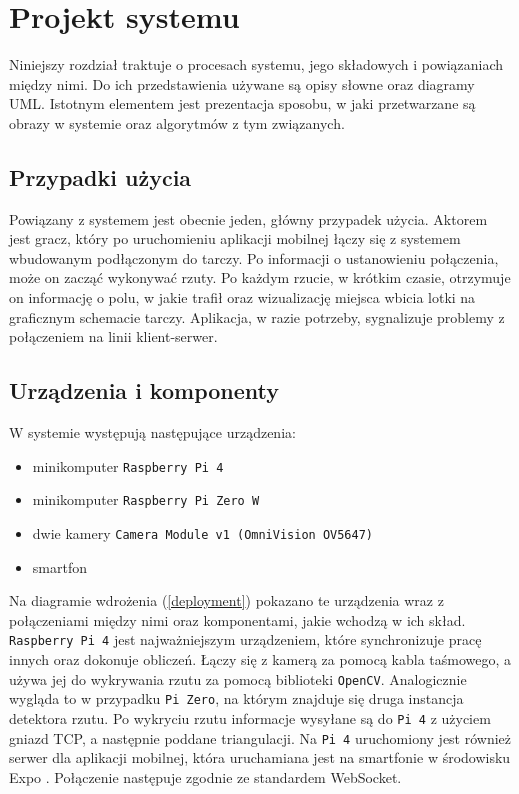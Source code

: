 \chapter{Projekt systemu}
\thispagestyle{chapterBeginStyle}

Niniejszy rozdział traktuje o procesach systemu, jego składowych i powiązaniach między nimi. Do ich przedstawienia używane są opisy słowne oraz diagramy UML. Istotnym elementem jest prezentacja sposobu, w jaki przetwarzane są obrazy w systemie oraz algorytmów z tym związanych.

\section{Przypadki użycia}
Powiązany z systemem jest obecnie jeden, główny przypadek użycia. Aktorem jest gracz, który po uruchomieniu aplikacji mobilnej łączy się z systemem wbudowanym podłączonym do tarczy. Po informacji o ustanowieniu połączenia, może on zacząć wykonywać rzuty. Po każdym rzucie, w krótkim czasie, otrzymuje on informację o polu, w jakie trafił oraz wizualizację miejsca wbicia lotki na graficznym schemacie tarczy. Aplikacja, w razie potrzeby, sygnalizuje problemy z połączeniem na linii klient-serwer.

\section{Urządzenia i komponenty}
W systemie występują następujące urządzenia:
\begin{itemize}
  \item minikomputer \verb|Raspberry Pi 4|
  \item minikomputer \verb|Raspberry Pi Zero W|
  \item dwie kamery \verb|Camera Module v1 (OmniVision OV5647)|
  \item smartfon
\end{itemize}

Na diagramie wdrożenia (\ref{deployment}) pokazano te urządzenia wraz z połączeniami między nimi oraz komponentami, jakie wchodzą w ich skład. \verb|Raspberry Pi 4| jest najważniejszym urządzeniem, które synchronizuje pracę innych oraz dokonuje obliczeń. Łączy się z kamerą za pomocą kabla taśmowego, a używa jej do wykrywania rzutu za pomocą biblioteki \verb|OpenCV|. Analogicznie wygląda to w przypadku \verb|Pi Zero|, na którym znajduje się druga instancja detektora rzutu. Po wykryciu rzutu informacje wysyłane są do \verb|Pi 4| z użyciem gniazd TCP, a następnie poddane triangulacji. Na \verb|Pi 4| uruchomiony jest również serwer dla aplikacji mobilnej, która uruchamiana jest na smartfonie w środowisku Expo \cite{expo}. Połączenie następuje zgodnie ze standardem WebSocket.

